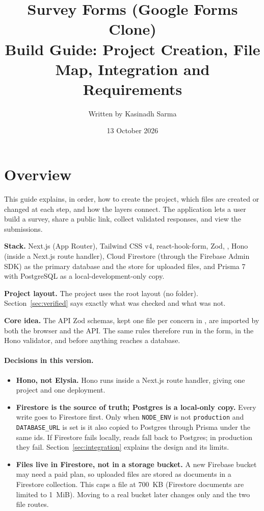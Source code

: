 \documentclass[11pt,a4paper]{article}
\title{\textbf{Survey Forms (Google Forms Clone)}\\[4pt]
\large Build Guide: Project Creation, File Map, Integration and Requirements}
\author{Written by Kasinadh Sarma}
\date{13 October 2026}
\begin{document}
\maketitle
\tableofcontents
\newpage

\section{Overview}
This guide explains, in order, how to create the project, which files are created or changed at each step, and how the layers connect. The application lets a user build a survey, share a public link, collect validated responses, and view the submissions.

\textbf{Stack.} Next.js (App Router), Tailwind CSS v4, react-hook-form, Zod, , Hono (inside a Next.js route handler), Cloud Firestore (through the Firebase Admin SDK) as the primary database and the store for uploaded files, and Prisma 7 with PostgreSQL as a local-development-only copy.

\textbf{Project layout.} The project uses the root  layout (no  folder). Section~\ref{sec:verified} says exactly what was checked and what was not.

\textbf{Core idea.} The API Zod schemas, kept one file per concern in , are imported by both the browser and the API. The same rules therefore run in the form, in the Hono validator, and before anything reaches a database.

\paragraph{Decisions in this version.}
\begin{itemize}
  \item \textbf{Hono, not Elysia.} Hono runs inside a Next.js route handler, giving one project and one deployment.
  \item \textbf{Firestore is the source of truth; Postgres is a local-only copy.} Every write goes to Firestore first. Only when \texttt{NODE\_ENV} is not \texttt{production} and \texttt{DATABASE\_URL} is set is it also copied to Postgres through Prisma under the same ids. If Firestore fails locally, reads fall back to Postgres; in production they fail. Section~\ref{sec:integration} explains the design and its limits.
  \item \textbf{Files live in Firestore, not in a storage bucket.} A new Firebase bucket may need a paid plan, so uploaded files are stored as documents in a Firestore collection. This caps a file at 700~KB (Firestore documents are limited to 1~MiB). Moving to a real bucket later changes only  and the two file routes.
\end{itemize}
\end{document}
